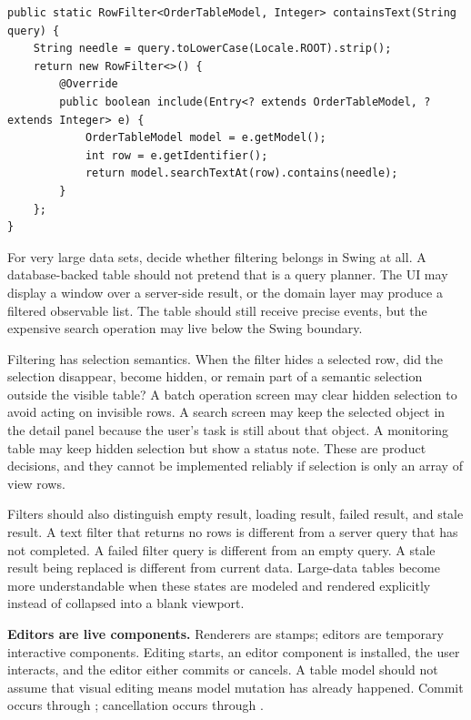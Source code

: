 \begin{lstlisting}[caption={A RowFilter that precomputes query state.}]
public static RowFilter<OrderTableModel, Integer> containsText(String query) {
    String needle = query.toLowerCase(Locale.ROOT).strip();
    return new RowFilter<>() {
        @Override
        public boolean include(Entry<? extends OrderTableModel, ? extends Integer> e) {
            OrderTableModel model = e.getModel();
            int row = e.getIdentifier();
            return model.searchTextAt(row).contains(needle);
        }
    };
}
\end{lstlisting}

For very large data sets, decide whether filtering belongs in Swing at all. A database-backed table should not pretend that  is a query planner. The UI may display a window over a server-side result, or the domain layer may produce a filtered observable list. The table should still receive precise events, but the expensive search operation may live below the Swing boundary.

Filtering has selection semantics. When the filter hides a selected row, did the selection disappear, become hidden, or remain part of a semantic selection outside the visible table? A batch operation screen may clear hidden selection to avoid acting on invisible rows. A search screen may keep the selected object in the detail panel because the user's task is still about that object. A monitoring table may keep hidden selection but show a status note. These are product decisions, and they cannot be implemented reliably if selection is only an array of view rows.

Filters should also distinguish empty result, loading result, failed result, and stale result. A text filter that returns no rows is different from a server query that has not completed. A failed filter query is different from an empty query. A stale result being replaced is different from current data. Large-data tables become more understandable when these states are modeled and rendered explicitly instead of collapsed into a blank viewport.

\textbf{Editors are live components.} Renderers are stamps; editors are temporary interactive components. Editing starts, an editor component is installed, the user interacts, and the editor either commits or cancels. A table model should not assume that visual editing means model mutation has already happened. Commit occurs through ; cancellation occurs through .

